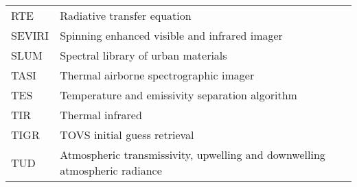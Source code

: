 \begin{table}[h]
\begin{tabular}{ll}
RTE & Radiative transfer equation \\
SEVIRI & Spinning enhanced visible and infrared imager \\
SLUM & Spectral library of urban materials \\
TASI & Thermal airborne spectrographic imager \\
TES & Temperature and emissivity separation algorithm \\
TIR & Thermal infrared \\
TIGR & TOVS initial guess retrieval \\
TUD & Atmospheric transmissivity, upwelling and downwelling atmospheric radiance \\
\end{tabular}
\end{table}

